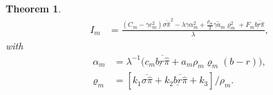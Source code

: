 \documentclass[10pt,a4paper]{amsart}
\newtheorem{theorem}{Theorem}
\newcommand \la {\lambda}
\begin{document}
\begin{theorem}
\begin{align}
				I_{\scriptscriptstyle m}&=\frac{(C_{\scriptscriptstyle m}-\gamma {c^2_{\scriptscriptstyle m}})\overline{\sigma\widehat{\pi}}^2-\lambda \gamma {\alpha^2_{\scriptscriptstyle m}}+{\frac{\rho_{\scriptscriptstyle m}}{2}\gamma \tilde{a}_{\scriptscriptstyle m}\varrho^2_{\scriptscriptstyle m}}+F_{\scriptscriptstyle m}\overline{\underline{br}\widehat{\pi}}}{\lambda},
			\end{align}
			with
			\begin{align}
				\alpha_{\scriptscriptstyle m}&=\la^{-1}\big({c_{\scriptscriptstyle m}\overline{\underline{br}\widehat{\pi}}+a_{\scriptscriptstyle m}\rho_{\scriptscriptstyle m} \varrho_{\scriptscriptstyle m}(b-r)}\big), \label{eq:MFe1}\\
				\varrho_{\scriptscriptstyle m}&={\left[k_1\overline{\sigma\widehat{\pi}}+k_2\overline{\underline{br}\widehat{\pi}}+k_3\right]/\rho_{\scriptscriptstyle m}}.
			\end{align}
	\end{theorem}
\end{document}
